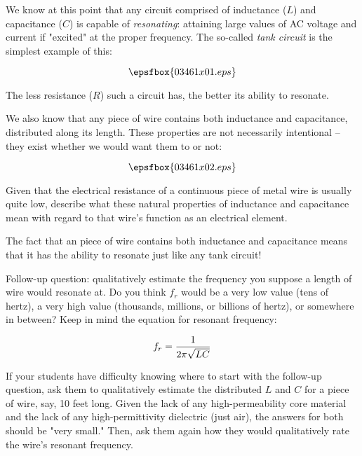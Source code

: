 

We know at this point that any circuit comprised of inductance ($L$) and capacitance ($C$) is capable of {\it resonating}: attaining large values of AC voltage and current if "excited" at the proper frequency.  The so-called {\it tank circuit} is the simplest example of this:

$$\epsfbox{03461x01.eps}$$

The less resistance ($R$) such a circuit has, the better its ability to resonate.

\vskip 10pt

We also know that any piece of wire contains both inductance and capacitance, distributed along its length.  These properties are not necessarily intentional -- they exist whether we would want them to or not:

$$\epsfbox{03461x02.eps}$$

Given that the electrical resistance of a continuous piece of metal wire is usually quite low, describe what these natural properties of inductance and capacitance mean with regard to that wire's function as an electrical element.







The fact that an piece of wire contains both inductance and capacitance means that it has the ability to resonate just like any tank circuit!

\vskip 10pt

Follow-up question: qualitatively estimate the frequency you suppose a length of wire would resonate at.  Do you think $f_r$ would be a very low value (tens of hertz), a very high value (thousands, millions, or billions of hertz), or somewhere in between?  Keep in mind the equation for resonant frequency:

$$f_r = {1 \over {2 \pi \sqrt{LC}}}$$







If your students have difficulty knowing where to start with the follow-up question, ask them to qualitatively estimate the distributed $L$ and $C$ for a piece of wire, say, 10 feet long.  Given the lack of any high-permeability core material and the lack of any high-permittivity dielectric (just air), the answers for both should be "very small."  Then, ask them again how they would qualitatively rate the wire's resonant frequency.




